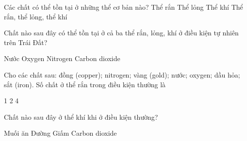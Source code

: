 \begin{ex}
	Các chất có thể tồn tại ở những thể cơ bản nào?
	\choice
	{Thể rắn}
	{Thể lỏng}
	{Thể khí}
	{\True Thể rắn, thể lỏng, thể khí}
	\end{ex}

\begin{ex}
	Chất nào sau đây có thể tồn tại ở cả ba thể rắn, lỏng, khí ở điều kiện tự nhiên trên Trái Đất?
	
	\choice
	{\True Nước}
	{Oxygen}
	{Nitrogen}
	{Carbon dioxide}
	\end{ex}

\begin{ex}
	Cho các chất sau: đồng (copper); nitrogen; vàng (gold); nước; oxygen; dầu hỏa; sắt (iron). Số chất ở thể rắn trong điều kiện thường là
	
	\choice
	{1}
	{2}
	{}
	{4}
	\end{ex}

\begin{ex}
	Chất nào sau đây ở thể khí khi ở điều kiện thường?
	
	\choice
	{Muối ăn}
	{Đường}
	{Giấm}
	{\True Carbon dioxide}
	\end{ex}








